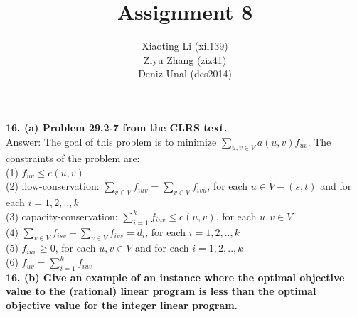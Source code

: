\documentclass{article}
\title{Assignment 8}
\author{Xiaoting Li (xil139) \\
Ziyu Zhang (ziz41) \\
Deniz Unal (des2014)}
\date{}
\begin{document}
\maketitle

\noindent
\textbf{16. (a) Problem 29.2-7 from the CLRS text.} \\ \newline
\noindent
Answer: The goal of this problem is to minimize $\sum_{u, v \in V} a(u, v)f_{uv}$. The constraints of the problem are: \\
(1) $f_{uv} \leq c(u, v)$\\
(2) flow-conservation: 
$\sum_{v\in V}f_{iuv} = \sum_{v\in V}f_{ivu}$, for each $u \in V - (s, t)$ and for each $i = 1, 2,.., k$\\
(3) capacity-conservation: 
$\sum_{i=1}^{k}f_{iuv} \leq c(u, v)$, for each $u, v \in V$\\
(4) $\sum_{v\in V}f_{isv} - \sum_{v\in V}f_{ivs} = d_{i}$, for each $i = 1, 2,.., k$\\
(5) $f_{iuv} \geq 0$, for each $u, v \in V$ and for each $i = 1, 2,.., k$\\
(6) $f_{uv} = \sum_{i=1}^{k}f_{iuv}$ \\

\noindent
\textbf{16. (b) Give an example of an instance where the optimal objective value to the (rational) linear program is less than the optimal objective value for the integer linear program.}
\end{document}
